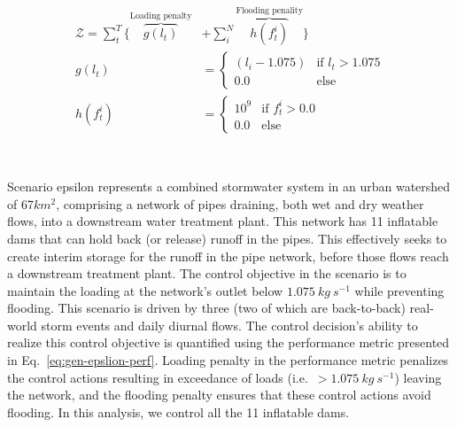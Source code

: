 
\begin{subequations}\label{eq:gen-epslion-perf}
\begin{align}
	\mathcal{Z} =  \sum^T_t \big\{ \overbrace{g(l_t)}^{\text{Loading penalty}} &+ \sum_i^N  \overbrace{h(f_t^i)}^{\text{Flooding penality}} \big\}\\
	g(l_t) &= \begin{cases}	
		(l_i - 1.075) &\text{if } l_t > 1.075\\
		0.0 &\text{else }
	\end{cases}\\
	h(f^i_t) &= \begin{cases}	
		10^9 &\text{if } f^i_t > 0.0\\
		0.0 &\text{else }
	\end{cases}
\end{align}
\end{subequations}

\

Scenario epsilon represents a combined stormwater system in an urban watershed of 67$km^2$, comprising a network of pipes draining, both wet and dry weather flows, into a downstream water treatment plant.
This network has 11 inflatable dams that can hold back (or release) runoff in the pipes.
This effectively seeks to create interim storage for the runoff in the pipe network, before those flows reach a downstream treatment plant. 
The control objective in the scenario is to maintain the loading at the network's outlet below $1.075\ kg\ s^{-1}$ while preventing flooding. 
This scenario is driven by three (two of which are back-to-back) real-world storm events and daily diurnal flows.
The control decision's ability to realize this control objective is quantified using the performance metric presented in Eq.~\ref{eq:gen-epslion-perf}.
Loading penalty in the performance metric penalizes the control actions resulting in exceedance of loads (i.e.\ $>1.075\ kg\ s^{-1}$) leaving the network, and the flooding penalty ensures that these control actions avoid flooding.
In this analysis, we control all the 11 inflatable dams.

